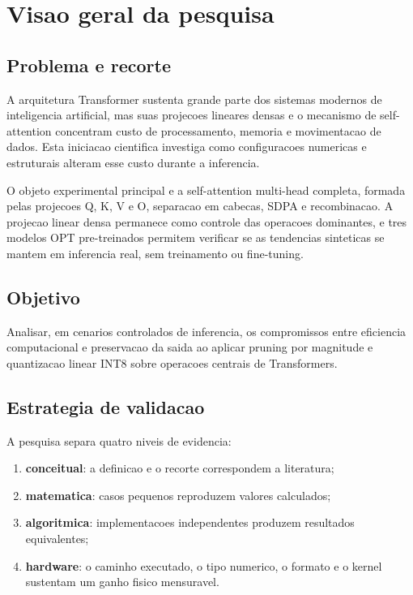 \chapter{Visao geral da pesquisa}

\section{Problema e recorte}

A arquitetura Transformer sustenta grande parte dos sistemas modernos de
inteligencia artificial, mas suas projecoes lineares densas e o mecanismo de
self-attention concentram custo de processamento, memoria e movimentacao de
dados. Esta iniciacao cientifica investiga como configuracoes numericas e
estruturais alteram esse custo durante a inferencia.

O objeto experimental principal e a self-attention multi-head completa, formada
pelas projecoes Q, K, V e O, separacao em cabecas, SDPA e recombinacao. A
projecao linear densa permanece como controle das operacoes dominantes, e tres
modelos OPT pre-treinados permitem verificar se as tendencias sinteticas se
mantem em inferencia real, sem treinamento ou fine-tuning.

\section{Objetivo}

Analisar, em cenarios controlados de inferencia, os compromissos entre eficiencia
computacional e preservacao da saida ao aplicar pruning por magnitude e
quantizacao linear INT8 sobre operacoes centrais de Transformers.

\section{Estrategia de validacao}

A pesquisa separa quatro niveis de evidencia:

\begin{enumerate}
  \item \textbf{conceitual}: a definicao e o recorte correspondem a literatura;
  \item \textbf{matematica}: casos pequenos reproduzem valores calculados;
  \item \textbf{algoritmica}: implementacoes independentes produzem resultados equivalentes;
  \item \textbf{hardware}: o caminho executado, o tipo numerico, o formato e o kernel sustentam um ganho fisico mensuravel.
\end{enumerate}

